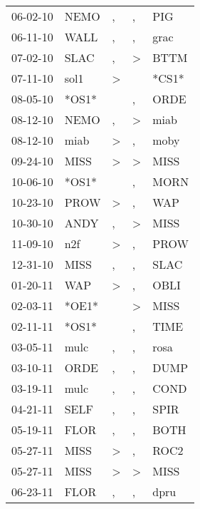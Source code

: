 \begin{supertabular}{lllll}
 06-02-10 &   NEMO &                , &                , &    PIG \\
 06-11-10 &   WALL &                , &                , &   grac \\
 07-02-10 &   SLAC &                , &     \textgreater &   BTTM \\
 07-11-10 &   sol1 &     \textgreater &                  &  *CS1* \\
 08-05-10 &  *OS1* &                  &                , &   ORDE \\
 08-12-10 &   NEMO &                , &     \textgreater &   miab \\
 08-12-10 &   miab &     \textgreater &                , &   moby \\
 09-24-10 &   MISS &     \textgreater &     \textgreater &   MISS \\
 10-06-10 &  *OS1* &                  &                , &   MORN \\
 10-23-10 &   PROW &     \textgreater &                , &    WAP \\
 10-30-10 &   ANDY &                , &     \textgreater &   MISS \\
 11-09-10 &    n2f &     \textgreater &                , &   PROW \\
 12-31-10 &   MISS &                , &                , &   SLAC \\
 01-20-11 &    WAP &     \textgreater &                , &   OBLI \\
 02-03-11 &  *OE1* &                  &     \textgreater &   MISS \\
 02-11-11 &  *OS1* &                  &                , &   TIME \\
 03-05-11 &   mulc &                , &                , &   rosa \\
 03-10-11 &   ORDE &                , &                , &   DUMP \\
 03-19-11 &   mulc &                , &                , &   COND \\
 04-21-11 &   SELF &                , &                , &   SPIR \\
 05-19-11 &   FLOR &                , &                , &   BOTH \\
 05-27-11 &   MISS &     \textgreater &                , &   ROC2 \\
 05-27-11 &   MISS &     \textgreater &     \textgreater &   MISS \\
 06-23-11 &   FLOR &                , &                , &   dpru \\

\end{supertabular}
